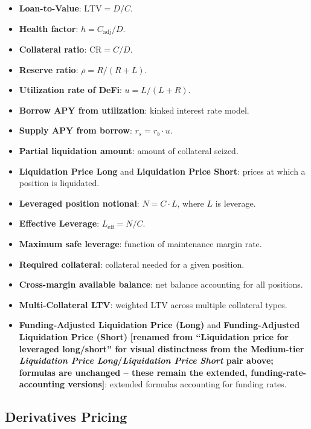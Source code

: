 \documentclass[twoside,11pt]{article}
\begin{document}
\begin{itemize}
  \item \textbf{Loan-to-Value}: $\mathrm{LTV} = D/C$.
  \item \textbf{Health factor}: $h = C_{\mathrm{adj}} / D$.
  \item \textbf{Collateral ratio}: $\mathrm{CR} = C/D$.
  \item \textbf{Reserve ratio}: $\rho = R / (R + L)$.
  \item \textbf{Utilization rate of DeFi}: $u = L / (L + R)$.
  \item \textbf{Borrow APY from utilization}: kinked interest rate model.
  \item \textbf{Supply APY from borrow}: $r_s = r_b \cdot u$.
  \item \textbf{Partial liquidation amount}: amount of collateral seized.
  \item \textbf{Liquidation Price Long} and \textbf{Liquidation Price Short}:
    prices at which a position is liquidated.
  \item \textbf{Leveraged position notional}: $N = C \cdot L$, where $L$ is leverage.
  \item \textbf{Effective Leverage}: $L_{\mathrm{eff}} = N/C$.
  \item \textbf{Maximum safe leverage}: function of maintenance margin rate.
  \item \textbf{Required collateral}: collateral needed for a given position.
  \item \textbf{Cross-margin available balance}: net balance accounting for all positions.
  \item \textbf{Multi-Collateral LTV}: weighted LTV across multiple collateral types.
  \item \textbf{Funding-Adjusted Liquidation Price (Long)} and
    \textbf{Funding-Adjusted Liquidation Price (Short)} \textbf{[renamed
    from ``Liquidation price for leveraged long/short'' for visual
    distinctness from the Medium-tier \emph{Liquidation Price
    Long}/\emph{Liquidation Price Short} pair above; formulas are
    unchanged -- these remain the extended, funding-rate-accounting
    versions]}: extended formulas accounting for funding rates.
\end{itemize}

\subsection{Derivatives Pricing}\label{subsec:derivatives-pricing}
\label{sec:bench_derivatives}
\end{document}
